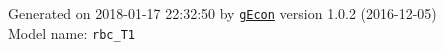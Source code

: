 \documentclass[10pt,a4paper]{article}
\numberwithin{equation}{section}
\begin{document}
\begin{landscape}
\begin{flushleft}{\large
Generated  on 2018-01-17 22:32:50 by \href{http://gecon.r-forge.r-project.org/}{\texttt{gEcon}} version 1.0.2 (2016-12-05)\\
Model name: \verb+rbc_T1+
}\end{flushleft}


\end{landscape}

\end{document}
